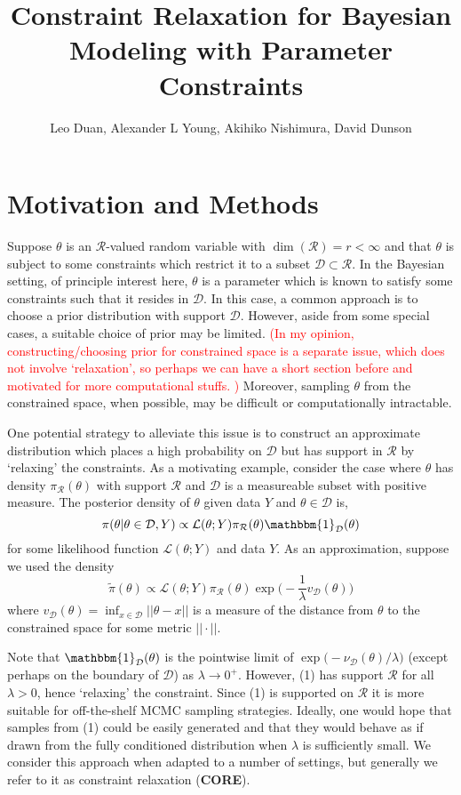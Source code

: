 \documentclass[12 point]{article}
\title{Constraint Relaxation for Bayesian Modeling with
Parameter Constraints}
\author{Leo Duan, Alexander L Young, Akihiko Nishimura, David Dunson}
\newcommand{\core}{\textbf{CORE}}
\newcommand{\leo}[1]{\textcolor{red}{ (#1)}}
\begin{document}
\maketitle

\section{Motivation and Methods}

Suppose $\theta$ is an $\mathcal{R}$-valued random variable with $\dim(\mathcal{R})=r<\infty$ and that $\theta$ is subject to some constraints which restrict it to a subset $\mathcal{D} \subset \mathcal{R}$. In the Bayesian setting, of principle interest here, $\theta$ is a parameter which is known to satisfy some constraints such that it resides in $\mathcal{D}$.  In this case, a common approach is to choose a prior distribution with support $\mathcal{D}.$ However, aside from some special cases, a suitable choice of prior may be limited.
 \leo{In my opinion, constructing/choosing prior for constrained space
is a separate issue, which does not involve  `relaxation', so perhaps we
can have a short section before and motivated for more computational stuffs.  }
  Moreover, sampling $\theta$ from the constrained space, when possible, may be difficult or computationally intractable.

One potential strategy to alleviate this issue is to construct an approximate distribution which places a high probability on $\mathcal{D}$ but has support in $\mathcal{R}$ by `relaxing' the constraints.   As a motivating example, consider the case where $\theta$ has density $\pi_\mathcal{R}(\theta)$ with support $\mathcal{R}$ and $\mathcal{D}$ is a measureable subset with positive measure.  The posterior density of $\theta$ given data $Y$ and $\theta \in \mathcal{D}$ is, $$\pi(\theta | \theta \in \mathcal{D}, Y) \propto \mathcal{L}(\theta; Y) \pi_\mathcal{R}(\theta) \mathbbm{1}_\mathcal{D} (\theta)$$ for some likelihood function $\mathcal{L}(\theta;Y)$ and data $Y$. 
As an approximation, suppose we used the density 
\begin{equation}
\label{EQ:Rel_Dens_Motivation}
\tilde{\pi}(\theta) \propto \mathcal{L}(\theta; Y)  \pi_\mathcal{R}(\theta) \exp\bigg(-\frac{1}{\lambda} v_\mathcal{D}(\theta)\bigg)
\end{equation} where $v_\mathcal{D}(\theta) = \inf_{x\in\mathcal{D}} ||\theta-x||$ is a measure of the distance from $\theta$ to the constrained space for some metric $||\cdot||$. 

Note that $\mathbbm{1}_\mathcal{D}(\theta)$ is the pointwise limit of $\exp\big(- \nu_\mathcal{D}(\theta)/\lambda)$ (except perhaps on the boundary of $\mathcal{D}$) as $\lambda \to 0^+.$ However, (1) has support $\mathcal{R}$ for all $\lambda > 0$, hence `relaxing' the constraint.   Since (1) is supported on $\mathcal{R}$ it is more suitable for off-the-shelf MCMC sampling strategies.   Ideally, one would hope that samples from (1) could be easily generated and that they would behave as if drawn from the fully conditioned distribution when $\lambda$ is sufficiently small. We consider this approach when adapted to a number of settings, but generally we refer to it as constraint relaxation (\core).
\end{document}
